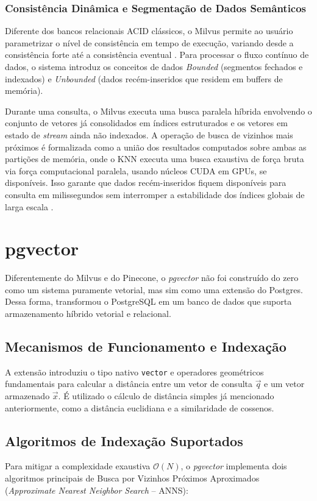 \documentclass[a4paper, 12pt]{article}
\begin{document}
\subsubsection{Consistência Dinâmica e Segmentação de Dados Semânticos}
Diferente dos bancos relacionais ACID clássicos, o Milvus permite ao usuário parametrizar o nível de consistência em tempo de execução, variando desde a consistência forte até a consistência eventual \cite{wang2021milvus}. Para processar o fluxo contínuo de dados, o sistema introduz os conceitos de dados \textit{Bounded} (segmentos fechados e indexados) e \textit{Unbounded} (dados recém-inseridos que residem em buffers de memória).

Durante uma consulta, o Milvus executa uma busca paralela híbrida envolvendo o conjunto de vetores já consolidados em índices estruturados e os vetores em estado de \textit{stream} ainda não indexados. A operação de busca de vizinhos mais próximos é formalizada como a união dos resultados computados sobre ambas as partições de memória, onde o KNN executa uma busca exaustiva de força bruta via força computacional paralela, usando núcleos CUDA em GPUs, se disponíveis. Isso garante que dados recém-inseridos fiquem disponíveis para consulta em milissegundos sem interromper a estabilidade dos índices globais de larga escala \cite{wang2021milvus}.

\section{pgvector}
\label{sec:pgvector}

Diferentemente do Milvus e do Pinecone, o \textit{pgvector} não foi construído do zero como um sistema puramente vetorial, mas sim como uma extensão do Postgres. Dessa forma, transformou o PostgreSQL em um banco de dados que suporta armazenamento híbrido vetorial e relacional.

\subsection{Mecanismos de Funcionamento e Indexação}
A extensão introduziu o tipo nativo \texttt{vector} e operadores geométricos fundamentais para calcular a distância entre um vetor de consulta $\vec{q}$ e um vetor armazenado $\vec{x}$. É utilizado o cálculo de distância simples já mencionado anteriormente, como a distância euclidiana e a similaridade de cossenos.

\subsection{Algoritmos de Indexação Suportados}
Para mitigar a complexidade exaustiva $\mathcal{O}(N)$, o \textit{pgvector} implementa dois algoritmos principais de Busca por Vizinhos Próximos Aproximados (\textit{Approximate Nearest Neighbor Search} -- ANNS):
\end{document}
